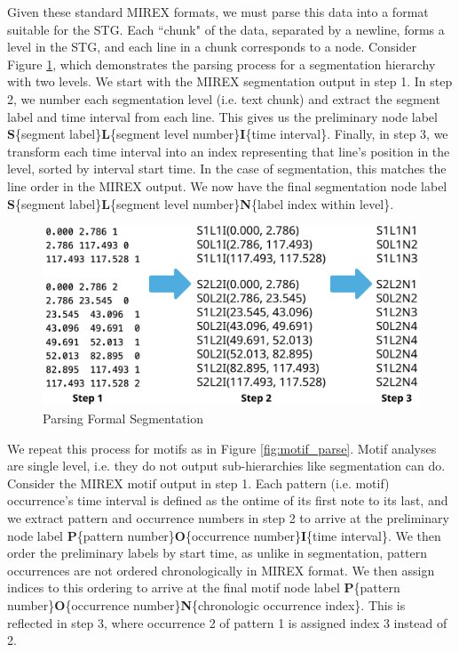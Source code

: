 \documentclass{article}
\begin{document}
Given these standard MIREX formats, we must parse this data into a format suitable for the STG. Each ``chunk" of the data, separated by a newline, forms a level in the STG, and each line in a chunk corresponds to a node. Consider Figure \ref{fig:form_parse}, which demonstrates the parsing process for a segmentation hierarchy with two levels. We start with the MIREX segmentation output in step 1. In step 2, we number each segmentation level (i.e. text chunk) and extract the segment label and time interval from each line. This gives us the preliminary node label \textbf{S}\{segment label\}\textbf{L}\{segment level number\}\textbf{I}\{time interval\}. Finally, in step 3, we transform each time interval into an index representing that line's position in the level, sorted by interval start time. In the case of segmentation, this matches the line order in the MIREX output. We now have the final segmentation node label \textbf{S}\{segment label\}\textbf{L}\{segment level number\}\textbf{N}\{label index within level\}. 

\begin{figure}[h!]
  \centering
  \includegraphics[width=\linewidth]{figs/form_parse}
  \caption{Parsing Formal Segmentation}
  \label{fig:form_parse}
\end{figure}

We repeat this process for motifs as in Figure \ref{fig:motif_parse}. Motif analyses are single level, i.e. they do not output sub-hierarchies like segmentation can do. Consider the MIREX motif output in step 1. Each pattern (i.e. motif) occurrence's time interval is defined as the ontime of its first note to its last, and we extract pattern and occurrence numbers in step 2 to arrive at the preliminary node label \textbf{P}\{pattern number\}\textbf{O}\{occurrence number\}\textbf{I}\{time interval\}. We then order the preliminary labels by start time, as unlike in segmentation, pattern occurrences are not ordered chronologically in MIREX format. We then assign indices to this ordering to arrive at the final motif node label \textbf{P}\{pattern number\}\textbf{O}\{occurrence number\}\textbf{N}\{chronologic occurrence index\}. This is reflected in step 3, where occurrence 2 of pattern 1 is assigned index 3 instead of 2. 
\end{document}
